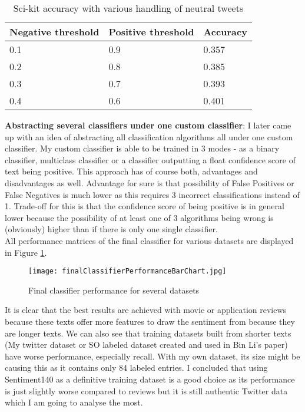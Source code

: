 \begin{table} [H]%
\centering
\begin{tabular}{|p{4cm}|p{4cm}|p{3cm}|}
 \hline
\textbf{ Negative threshold }& \textbf{Positive threshold} & \textbf{Accuracy}\\
 \hline
 0.1 & 0.9 & 0.357\\ \hline
 0.2 & 0.8 & 0.385\\ \hline
 0.3 & 0.7 & 0.393\\ \hline 
 0.4 & 0.6 & 0.401\\ \hline 
\end{tabular}
\caption{Sci-kit accuracy with various handling of neutral tweets}
\label{table:negativeAccuracy}
\end{table}

\textbf{Abstracting several classifiers under one custom classifier}:
I later came up with an idea of abstracting all classification algorithms all under one custom classifier. My custom classifier is able to be trained in 3 modes - as a binary classifier, multiclass classifier or a classifier outputting a float confidence score of text being positive.
This approach has of course both, advantages and disadvantages as well. Advantage for sure is that possibility of False Positives or False Negatives is much lower as this requires 3 incorrect classifications instead of 1. Trade-off for this is that the confidence score of being positive is in general lower because the possibility of at least one of 3 algorithms being wrong is (obviously) higher than if there is only one single classifier.\\

All performance matrices of the final classifier for various datasets are displayed in Figure \ref{fig:finalClassifierPerformanceBarChart}.
\\

\begin{figure}[H]%
    \centering
	\texttt{[image: finalClassifierPerformanceBarChart.jpg]}
    \caption{Final classifier performance for several datasets}%
    \label{fig:finalClassifierPerformanceBarChart}%
\end{figure}

It is clear that the best results are achieved with movie or application reviews because these texts offer more features to draw the sentiment from because they are longer texts. We can also see that training datasets built from shorter texts (My twitter dataset or SO labeled dataset created and used in Bin Li's paper) have worse performance, especially recall. With my own dataset, its size might be causing this as it contains only 84 labeled entries. I concluded that using Sentiment140 as a definitive training dataset is a good choice as its performance is just slightly worse compared to reviews but it is still authentic Twitter data which I am going to analyse the most.